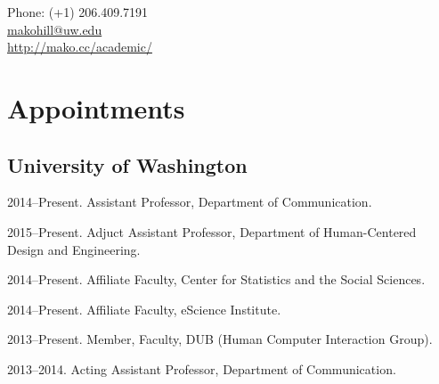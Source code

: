 \documentclass[10pt]{article}
\makeatletter
\def\myemail{makohill@uw.edu}
\def\myweb{http://mako.cc/academic/}
\newenvironment{cvlist}{
\begin{list}{}{\leftmargin=3.0em \itemindent=-3.0em}
  \setlength{\itemsep}{0pt}
  \setlength{\parskip}{0em}
  \setlength{\parsep}{1em}
  \setlength{\parindent}{0em}}
{\vspace{1em}
\end{list}}
\makeatother
\begin{document}
\baselineskip 12.5pt

\pagestyle{fancy}
\renewcommand{\headrulewidth}{0pt}
\fancyhead{}
\fancyfoot{}
\rhead{{\scriptsize\thepage}}


\begin{minipage}[t]{3in}
  
\end{minipage}
\hfill     
\begin{minipage}[t]{0.0in}
\end{minipage}
\hfill
\begin{minipage}[t]{1.7in}
  \flushright \footnotesize Phone: (+1) 206.409.7191 \\ 
  \href{mailto:\myemail}{\myemail} \\
  \href{\myweb}{\myweb}
\end{minipage}

\vspace{2em}


\medskip

\section{Appointments}

\subsection{University of Washington}
\begin{cvlist}
\item 2014--Present. Assistant Professor, Department of Communication.
\item 2015--Present. Adjuct Assistant Professor, Department of Human-Centered Design and Engineering.
\item 2014--Present. Affiliate Faculty, Center for Statistics and the
  Social Sciences.
\item 2014--Present. Affiliate Faculty, eScience Institute.
\item 2013--Present. Member, Faculty, DUB (Human Computer Interaction Group).
\item 2013--2014. Acting Assistant Professor, Department of Communication.
\end{cvlist}
\end{document}

